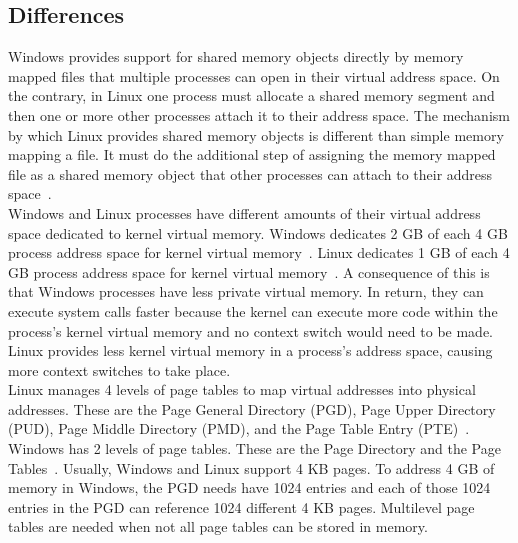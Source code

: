 \documentclass[letterpaper,10pt,titlepage]{article}
\begin{document}
\subsection{Differences}
Windows provides support for shared memory objects directly by memory 
mapped files that multiple processes can open in their virtual address space.
On the contrary, in Linux one process must allocate a shared memory segment and
then one or more other processes attach it to their address space. The 
mechanism by which Linux provides shared memory objects is different than 
simple memory mapping a file. It must do the additional step of assigning the
memory mapped file as a shared memory object that other processes can attach
to their address space~\cite{tm10}.
\\
\linebreak
Windows and Linux processes have different amounts of their virtual address
space dedicated to kernel virtual memory. Windows dedicates 2 GB of each 4 GB
process address space for kernel virtual memory~\cite{tm11}. Linux dedicates 1 GB of each
4 GB process address space for kernel virtual memory~\cite{tm10}. A consequence of this 
is that Windows processes have less private virtual memory. In return, they 
can execute system calls faster because the kernel can execute more code 
within the process's kernel virtual memory and no context switch would need to
be made. Linux provides less kernel virtual memory in a process's address 
space, causing more context switches to take place. 
\\ 
\linebreak
Linux manages 4 levels of page tables to map virtual addresses into physical
addresses. These are the Page General Directory (PGD), Page Upper Directory
(PUD), Page Middle Directory (PMD), and the Page Table Entry (PTE)~\cite{tm10}. Windows
has 2 levels of page tables. These are the Page Directory and the Page Tables~\cite{tm11}.
Usually, Windows and Linux support 4 KB pages. To address 4 GB of memory in
Windows, the PGD needs have 1024 entries and each of those 1024 entries in
the PGD can reference 1024 different 4 KB pages. Multilevel page tables
are needed when not all page tables can be stored in memory.
\end{document}
